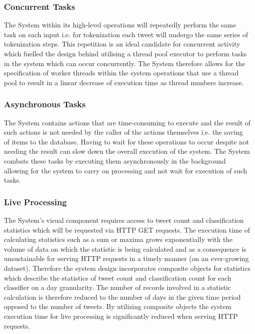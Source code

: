 \documentclass[11pt]{report}
\begin{document}
\subsubsection*{Concurrent Tasks}
The System within its high-level operations will repeatedly perform the same task on each input i.e. for tokenization each tweet will undergo the same series of tokenization steps. This repetition is an ideal candidate for concurrent activity which fuelled the design behind utilising a thread pool executor to perform tasks in the system which can occur concurrently. The System therefore allows for the specification of worker threads within the system operations that use a thread pool to result in a linear decrease of execution time as thread numbers increase.

\subsubsection*{Asynchronous Tasks}
The System contains actions that are time-consuming to execute and the result of such actions is not needed by the caller of the actions themselves i.e. the saving of items to the database. Having to wait for these operations to occur despite not needing the result can slow down the overall execution of the system. The System combats these tasks by executing them asynchronously in the background allowing for the system to carry on processing and not wait for execution of such tasks.

\subsubsection*{Live Processing}
The System's visual component requires access to tweet count and classification statistics which will be requested via HTTP GET requests. The execution time of calculating statistics such as a sum or maxima grows exponentially with the volume of data on which the statistic is being calculated and as a consequence is unsustainable for serving HTTP requests in a timely manner (on an ever-growing dataset). Therefore the system design incorporates composite objects for statistics which describe the statistics of tweet count and classification count for each classifier on a day granularity. The number of records involved in a statistic calculation is therefore reduced to the number of days in the given time period opposed to the number of tweets. By utilizing composite objects the system execution time for live processing is significantly reduced when serving HTTP requests.
\end{document}
